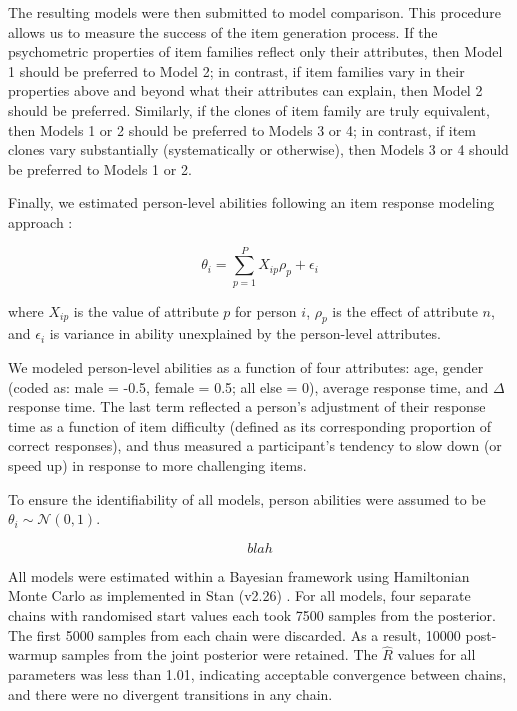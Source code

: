 \documentclass[a4paper,man,natbib]{apa6}
\begin{document}
The resulting models were then submitted to model comparison. This procedure allows us to measure the success of the item generation process. If the psychometric properties of item families reflect only their attributes, then Model 1 should be preferred to Model 2; in contrast, if item families vary in their properties above and beyond what their attributes can explain, then Model 2 should be preferred. Similarly, if the clones of item family are truly equivalent, then Models 1 or 2 should be preferred to Models 3 or 4; in contrast, if item clones vary substantially (systematically or otherwise), then Models 3 or 4 should be preferred to Models 1 or 2.

Finally, we estimated person-level abilities following an item response modeling approach \citep{wilson2008explanatory}:   

\begin{equation}
\theta_i = \sum_{p=1}^P X_{ip} \rho_p + \epsilon_i    
\end{equation}

\noindent where $X_{ip}$ is the value of attribute $p$ for person $i$, $\rho_p$ is the effect of attribute $n$, and $\epsilon_i$ is variance in ability unexplained by the person-level attributes.

We modeled person-level abilities as a function of four attributes: age, gender (coded as: male = -0.5, female = 0.5; all else = 0), average response time, and $\Delta$ response time. The last term reflected a person's adjustment of their response time as a function of item difficulty (defined as its corresponding proportion of correct responses), and thus measured a participant's tendency to slow down (or speed up) in response to more challenging items.

To ensure the identifiability of all models, person abilities were assumed to be $\theta_i \sim \mathcal{N} \left(0,1\right)$. 

\begin{equation}
blah 
\end{equation}

All models were estimated within a Bayesian framework using Hamiltonian Monte Carlo as implemented in Stan (v2.26) \citep{carpenter2017stan}. For all models, four separate chains with randomised start values each took 7500 samples from the posterior. The first 5000 samples from each chain were discarded. As a result, 10000 post-warmup samples from the joint posterior were retained. The $\hat{R}$ values for all parameters was less than 1.01, indicating acceptable convergence between chains, and there were no divergent transitions in any chain. 
\end{document}

